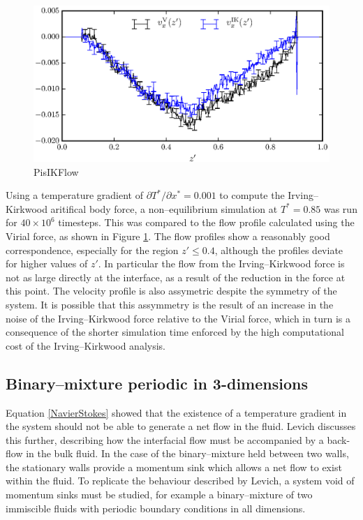 \begin{figure}[h]
\centering
\includegraphics[scale=0.8]{PisIKFlow}
\caption{PisIKFlow}
\label{PisIKFlow}
\end{figure}
Using a temperature gradient of $\partial T^{*} / \partial x^{*} = 0.001$ to compute the Irving--Kirkwood aritifical body force, a non--equilibrium simulation at $T^{*} = 0.85$ was run for $40 \times 10^{6}$ timesteps.
This was compared to the flow profile calculated using the Virial force, as shown in Figure \ref{PisIKFlow}.
The flow profiles show a reasonably good correspondence, especially for the region $z' \leq 0.4$, although the profiles deviate for higher values of $z'$.
In particular the flow from the Irving--Kirkwood force is not as large directly at the interface, as a result of the reduction in the force at this point.
The velocity profile is also assymetric despite the symmetry of the system.
It is possible that this assymmetry is the result of an increase in the noise of the Irving--Kirkwood force relative to the Virial force, which in turn is a consequence of the shorter simulation time enforced by the high computational cost of the Irving--Kirkwood analysis.

\subsection{Binary--mixture periodic in 3-dimensions}
Equation \ref{NavierStokes} showed that the existence of a temperature gradient in the system should not be able to generate a net flow in the fluid. 
Levich discusses this further, describing how the interfacial flow must be accompanied by a back-flow in the bulk fluid.\cite{Levich}
In the case of the binary--mixture held between two walls, the stationary walls provide a momentum sink which allows a net flow to exist within the fluid.
To replicate the behaviour described by Levich, a system void of momentum sinks must be studied, for example a binary--mixture of two immiscible fluids with periodic boundary conditions in all dimensions.

